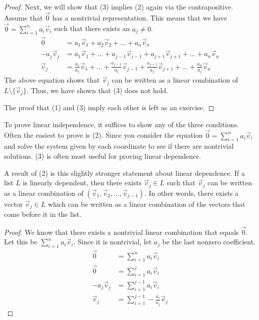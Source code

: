\begin{proof}
    Next, we will show that (3) implies (2) again via the contrapositive. Assume that $\vec{0}$ has a nontrivial representation. This means that we have $\vec{0}=\sum_{i=1}^n a_i\vec{v}_i$ such that there exists an $a_j\neq 0$.
    \begin{align*}
        \vec{0}&=a_1\vec{v}_1+a_2\vec{v}_2+\ldots+a_n\vec{v}_n\\
        -a_j\vec{v}_j&=a_1\vec{v}_1+\ldots+a_{j-1}\vec{v}_{j-1}+a_{j+1}\vec{v}_{j+1}+\ldots+a_n\vec{v}_n\\
        \vec{v}_j&=\frac{a_1}{a_j}\vec{v}_1+\ldots+\frac{a_{j-1}}{a_j}\vec{v}_{j-1}+\frac{a_{j+1}}{a_j}\vec{v}_{j+1}+\ldots+\frac{a_n}{a_j}\vec{v}_n\tag{we can divide since $a_j\neq 0$}
    \end{align*}
    The above equation shows that $\vec{v}_j$ can be written as a linear combination of $L\setminus\{\vec{v}_j\}$. Thus, we have shown that (3) does not hold.

    The proof that (1) and (3) imply each other is left as an exercise.
\end{proof}
\begin{remark}
    To prove linear independence, it suffices to show any of the three conditions. Often the easiest to prove is (2). Since you consider the equation $\vec{0}=\sum_{i=1}^n a_i\vec{v}_i$ and solve the system given by each coordinate to see if there are nontrivial solutions. (3) is often most useful for proving linear dependence. 
\end{remark}
\begin{corollary}
    A result of (2) is this slightly stronger statement about linear dependence. If a list $L$ is linearly dependent, then there exists $\vec{v}_j\in L$ such that $\vec{v}_j$ can be written as a linear combination of $(\vec{v}_1,\vec{v}_2,\ldots,\vec{v}_{j-1})$. In other words, there exists a vector $\vec{v}_j\in L$ which can be written as a linear combination of the vectors that come before it in the list.
\end{corollary}
\begin{proof}
    We know that there exists a nontrivial linear combination that equals $\vec{0}$. Let this be $\sum_{i=1}^n a_i\vec{v}_i$. Since it is nontrivial, let $a_j$ be the last nonzero coefficient.
    \begin{align*}
        \vec{0}&=\sum_{i=1}^n a_i\vec{v}_i\\
        \vec{0}&=\sum_{i=1}^j a_i\vec{v}_i\tag{since $a_j$ is the last nonzero coefficient}\\
        -a_j\vec{v}_j&=\sum_{i=1}^{j-1}a_i\vec{v}_i\\
        \vec{v}_j&=\sum_{i=1}^{j-1}-\frac{a_i}{a_j}\vec{v}_j
    \end{align*}
\end{proof}
